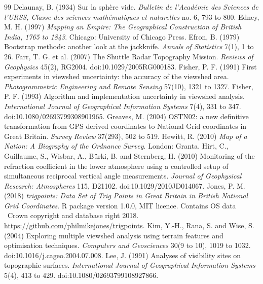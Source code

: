 \documentclass[11pt,a4paper]{article}
\begin{document}
\begin{thebibliography}{99}
 Delaunay, B. (1934) Sur la sph\`ere vide. \textit{Bulletin de l'Acad\'emie des Sciences de l'URSS, Classe des sciences math\'ematiques et naturelles} no. 6, 793 to 800.
 Edney, M. H. (1997) \textit{Mapping an Empire: The Geographical Construction of British India, 1765 to 1843}. Chicago: University of Chicago Press.
 Efron, B. (1979) Bootstrap methods: another look at the jackknife. \textit{Annals of Statistics} 7(1), 1 to 26.
 Farr, T. G. et al. (2007) The Shuttle Radar Topography Mission. \textit{Reviews of Geophysics} 45(2), RG2004. doi:10.1029/2005RG000183.
 Fisher, P. F. (1991) First experiments in viewshed uncertainty: the accuracy of the viewshed area. \textit{Photogrammetric Engineering and Remote Sensing} 57(10), 1321 to 1327.
 Fisher, P. F. (1993) Algorithm and implementation uncertainty in viewshed analysis. \textit{International Journal of Geographical Information Systems} 7(4), 331 to 347. doi:10.1080/02693799308901965.
 Greaves, M. (2004) OSTN02: a new definitive transformation from GPS derived coordinates to National Grid coordinates in Great Britain. \textit{Survey Review} 37(293), 502 to 519.
 Hewitt, R. (2010) \textit{Map of a Nation: A Biography of the Ordnance Survey}. London: Granta.
 Hirt, C., Guillaume, S., Wisbar, A., B\"urki, B. and Sternberg, H. (2010) Monitoring of the refraction coefficient in the lower atmosphere using a controlled setup of simultaneous reciprocal vertical angle measurements. \textit{Journal of Geophysical Research: Atmospheres} 115, D21102. doi:10.1029/2010JD014067.
 Jones, P. M. (2018) \textit{trigpoints: Data Set of Trig Points in Great Britain in British National Grid Coordinates}. R package version 1.0.0, MIT licence. Contains OS data \textcopyright\ Crown copyright and database right 2018. \url{https://github.com/philmikejones/trigpoints}.
 Kim, Y.-H., Rana, S. and Wise, S. (2004) Exploring multiple viewshed analysis using terrain features and optimisation techniques. \textit{Computers and Geosciences} 30(9 to 10), 1019 to 1032. doi:10.1016/j.cageo.2004.07.008.
 Lee, J. (1991) Analyses of visibility sites on topographic surfaces. \textit{International Journal of Geographical Information Systems} 5(4), 413 to 429. doi:10.1080/02693799108927866.

\end{thebibliography}
\end{document}
